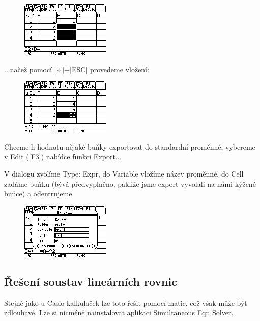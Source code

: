 \documentclass[10pt,a4paper,float]{article}
\begin{document}
\begin{figure}[H]
	\centering
	\includegraphics[width=.5\textwidth]{img/CELL3}
\end{figure}

...načež pomocí [$\diamond$]+[ESC] provedeme vložení:

\begin{figure}[H]
	\centering
	\includegraphics[width=.5\textwidth]{img/CELL4}
\end{figure}

Chceme-li hodnotu nějaké buňky exportovat do standardní proměnné, vybereme v Edit ([F3]) nabídce funkci Export...

\pagebreak

V dialogu zvolíme Type: Expr, do Variable vložíme název proměnné, do Cell zadáme buňku (bývá předvyplněno, pakliže jsme export vyvolali na námi kýžené buňce) a odentrujeme.

\begin{figure}[H]
	\centering
	\includegraphics[width=.5\textwidth]{img/CELL5}
\end{figure}

\subsection{Řešení soustav lineárních rovnic}
Stejně jako u Casio kalkulaček lze toto řešit pomocí matic, což však může být zdlouhavé. Lze si nicméně nainstalovat aplikaci Simultaneous Eqn Solver.
\end{document}
